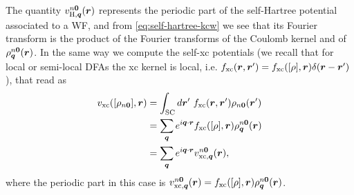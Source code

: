 The quantity $v_{{\rm H},{\bm q}}^{n{\bm 0}}({\bm r})$ represents the periodic part of the self-Hartree potential associated to a WF, and from \cref{eq:self-hartree-kcw} we see that its Fourier transform is the product of the Fourier transforms of the Coulomb kernel and of $\rho^{n\bm{0}}_{{\bm q}}({\bm r})$. In the same way we compute the self-xc potentials (we recall that for local or semi-local DFAs the xc kernel is local, i.e. $f_{\rm xc}({\bm r},{\bm r}') = f_{\rm xc}([\rho],{\bm r}) \delta({\bm r}-{\bm r}')$), that read as
%
\begin{equation}
    \begin{split}
        v_{\rm xc}([\rho_{n{\bm 0}}],{\bm r}) &= \int_{\rm SC} d{\bm r}' \ f_{\rm xc}({\bm r},{\bm r}') \rho_{n{\bm 0}}({\bm r}') \\
        &= \sum_{{\bm q}} e^{i {\bm q} \cdot {\bm r}} f_{\rm xc}([\rho],{\bm r}) \rho^{n {\bm 0}}_{{\bm q}} ({\bm r}) \\
        &= \sum_{{\bm q}} e^{i {\bm q} \cdot {\bm r}} v_{{\rm xc},{\bm q}}^{n{\bm 0}}({\bm r}) ,
    \end{split}
    \label{eq:self-xc-kcw}
\end{equation}
%
where the periodic part in this case is $v_{{\rm xc},{\bm q}}^{n{\bm 0}}({\bm r}) = f_{\rm xc}([\rho],{\bm r}) \rho^{n {\bm 0}}_{{\bm q}} ({\bm r})$.

